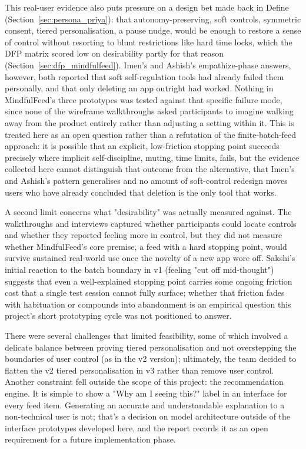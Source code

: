 \documentclass[11pt]{article}
\begin{document}
This real-user evidence also puts pressure on a design bet made back in Define (Section~\ref{sec:persona_priya}): that autonomy-preserving, soft controls, symmetric consent, tiered personalisation, a pause nudge, would be enough to restore a sense of control without resorting to blunt restrictions like hard time locks, which the DFP matrix scored low on desirability partly for that reason (Section~\ref{sec:dfp_mindfulfeed}). Imen's and Ashish's empathize-phase answers, however, both reported that soft self-regulation tools had already failed them personally, and that only deleting an app outright had worked. Nothing in MindfulFeed's three prototypes was tested against that specific failure mode, since none of the wireframe walkthroughs asked participants to imagine walking away from the product entirely rather than adjusting a setting within it. This is treated here as an open question rather than a refutation of the finite-batch-feed approach: it is possible that an explicit, low-friction stopping point succeeds precisely where implicit self-discipline, muting, time limits, fails, but the evidence collected here cannot distinguish that outcome from the alternative, that Imen's and Ashish's pattern generalises and no amount of soft-control redesign moves users who have already concluded that deletion is the only tool that works.

A second limit concerns what "desirability" was actually measured against. The walkthroughs and interviews captured whether participants could locate controls and whether they reported feeling more in control, but they did not measure whether MindfulFeed's core premise, a feed with a hard stopping point, would survive sustained real-world use once the novelty of a new app wore off. Sakshi's initial reaction to the batch boundary in v1 (feeling "cut off mid-thought") suggests that even a well-explained stopping point carries some ongoing friction cost that a single test session cannot fully surface; whether that friction fades with habituation or compounds into abandonment is an empirical question this project's short prototyping cycle was not positioned to answer.

There were several challenges that limited feasibility, some of which involved a delicate balance between proving tiered personalisation and not overstepping the boundaries of user control (as in the v2 version); ultimately, the team decided to flatten the v2 tiered personalisation in v3 rather than remove user control. Another constraint fell outside the scope of this project: the recommendation engine. It is simple to show a "Why am I seeing this?" label in an interface for every feed item. Generating an accurate and understandable explanation to a non-technical user is not; that's a decision on model architecture outside of the interface prototypes developed here, and the report records it as an open requirement for a future implementation phase.
\end{document}
